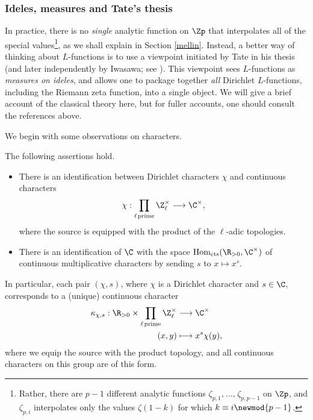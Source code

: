 \documentclass[a4paper,10pt, english, reqno]{smfart}
\newcommand{\Homc}{\mathrm{Hom}_{\mathrm{cts}}}
\numberwithin{equation}{section}
\begin{document}
\subsubsection{Ideles, measures and Tate's thesis} \label{sec:dirichlet ideles}

In practice, there is no \emph{single} analytic function on $\Zp$ that interpolates all of the special values\footnote{Rather, there are $p-1$ different analytic functions $\zeta_{p,1}, \hspace{1pt}..., \hspace{1pt}\zeta_{p,p-1}$ on $\Zp$, and $\zeta_{p,i}$ interpolates only the values $\zeta(1-k)$ for which $k \equiv i \newmod{p-1}$.}, as we shall explain in Section \ref{mellin}. Instead, a better way of thinking about $L$-functions is to use a viewpoint initiated by Tate in his thesis \cite{Tat50} (and later independently by Iwasawa; see \cite{Iwa52}). This viewpoint sees $L$-functions as \emph{measures on ideles}, and allows one to package together \emph{all} Dirichlet $L$-functions, including the Riemann zeta function, into a single object. We will give a brief account of the classical theory here, but for fuller accounts, one should consult the references above.

We begin with some observations on characters.


\begin{proposition} \label{prop:dirichlet ideles}  The following assertions hold.
\begin{itemize}
\item[(i)] There is an identification between Dirichlet characters $\chi$ and continuous characters\[ \chi : \prod_{\ell\hspace{1pt}\mathrm{prime}} \Z_\ell^\times \longrightarrow \C^\times, \]
where the source is equipped with the product of the $\ell$-adic topologies.
\item[(ii)]
There is an identification of $\C$ with the space $\Homc(\R_{>0},\C^\times)$ of  continuous multiplicative characters by sending $s$ to $x \mapsto x^s$.
\end{itemize}

In particular, each pair $(\chi,s)$, where $\chi$ is a Dirichlet character and $s\in\C$, corresponds to a (unique) continuous character
	\begin{align*}\kappa_{\chi,s} : \R_{>0} \times \prod_{\ell\hspace{1pt}\mathrm{prime}} \Z_\ell^\times &\longrightarrow \C^\times\\
		(x,y) &\longmapsto x^s\chi(y),
	\end{align*}
where we equip the source with the product topology, and all continuous characters on this group are of this form.
\end{proposition}
\end{document}
